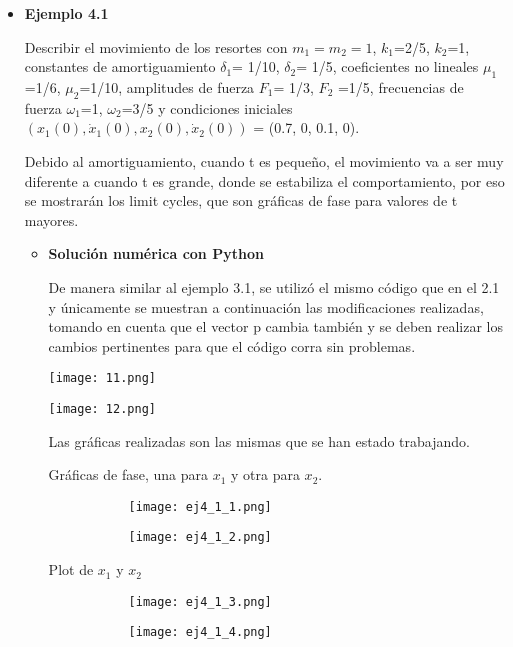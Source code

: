 \documentclass[12pt]{article}
\begin{document}
\begin{itemize}
\item \textbf{Ejemplo 4.1}

Describir el movimiento de los resortes con $m_1 = m_2 = 1$, $k_1$=2/5, $k_2$=1, constantes de amortiguamiento $\delta _1$= 1/10, $\delta _2$= 1/5, coeficientes no lineales $\mu _1$=1/6, $\mu _2$=1/10, amplitudes de fuerza $F_1$= 1/3, $F_2$ =1/5, frecuencias de fuerza $\omega _1$=1, $\omega _2$=3/5 y condiciones iniciales $(x_1(0), \dot x_1(0), x_2(0), \dot x_2(0))$ = (0.7, 0, 0.1, 0).

Debido al amortiguamiento, cuando t es pequeño, el movimiento va a ser muy diferente a cuando t es grande, donde se estabiliza el comportamiento, por eso se mostrarán los limit cycles, que son gráficas de fase para valores de t mayores. 

\begin{itemize}
\item \textbf{Solución numérica con Python}

De manera similar al ejemplo 3.1, se utilizó el mismo código que en el 2.1 y únicamente se muestran a continuación las modificaciones realizadas, tomando en cuenta que el vector p cambia también y se deben realizar los cambios pertinentes para que el código corra sin problemas.

\begin{center}
        \texttt{[image: 11.png]}
\end{center}
\begin{center}
        \texttt{[image: 12.png]}
\end{center}

Las gráficas realizadas son las mismas que se han estado trabajando.

\clearpage
Gráficas de fase, una para $x_1$ y otra para $x_2$.

\begin{figure}[h!]
\begin{subfigure}{.55\textwidth}
\centering
\texttt{[image: ej4\_1\_1.png]}
\end{subfigure}
\begin{subfigure}{.55\textwidth}
\centering
\texttt{[image: ej4\_1\_2.png]}
\end{subfigure}
\end{figure}

Plot de $x_1$ y $x_2$

\begin{figure}[h!]
\begin{subfigure}{.55\textwidth}
\centering
\texttt{[image: ej4\_1\_3.png]}
\end{subfigure}
\begin{subfigure}{.55\textwidth}
\centering
\texttt{[image: ej4\_1\_4.png]}
\end{subfigure}
\end{figure}


\end{itemize}
\end{itemize}
\end{document}
